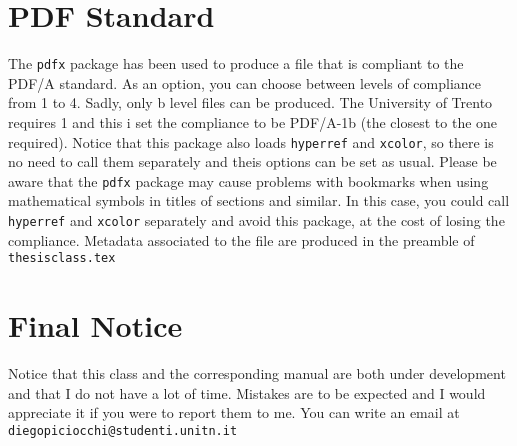 \section{PDF Standard}

The \texttt{pdfx} package has been used to produce a file that is compliant to the PDF/A standard. As an option, you can choose between levels of compliance from 1 to 4. Sadly, only b level files can be produced. The University of Trento requires 1 and this i set the compliance to be PDF/A-1b (the closest to the one required). Notice that this package also loads \texttt{hyperref} and \texttt{xcolor}, so there is no need to call them separately and theis options can be set as usual. Please be aware that the \texttt{pdfx} package may cause problems with bookmarks when using mathematical symbols in titles of sections and similar. In this case, you could call \texttt{hyperref} and \texttt{xcolor} separately and avoid this package, at the cost of losing the compliance. Metadata associated to the file are produced in the preamble of \texttt{thesisclass.tex}

\section{Final Notice}

Notice that this class and the corresponding manual are both under development and that I do not have a lot of time. Mistakes are to be expected and I would appreciate it if you were to report them to me. You can write an email at \texttt{diegopiciocchi@studenti.unitn.it} 









